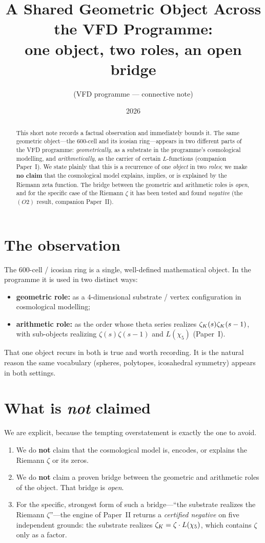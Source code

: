 \documentclass[11pt]{article}
\title{A Shared Geometric Object Across the VFD Programme:\\ one object, two roles,
an open bridge}
\author{(VFD programme --- connective note)}
\date{2026}
\begin{document}
\maketitle

\begin{abstract}
This short note records a factual observation and immediately bounds it. The same
geometric object---the $600$-cell and its icosian ring---appears in two different
parts of the VFD programme: \emph{geometrically}, as a substrate in the programme's
cosmological modelling, and \emph{arithmetically}, as the carrier of certain
$L$-functions (companion Paper~I). We state plainly that this is a recurrence of one
\emph{object} in two \emph{roles}; we make \textbf{no claim} that the cosmological
model explains, implies, or is explained by the Riemann zeta function. The bridge
between the geometric and arithmetic roles is \emph{open}, and for the specific case
of the Riemann $\zeta$ it has been tested and found \emph{negative} (the $(O2)$
result, companion Paper~II).
\end{abstract}

\section{The observation}
The $600$-cell / icosian ring is a single, well-defined mathematical object. In the
programme it is used in two distinct ways:
\begin{itemize}
  \item \textbf{geometric role:} as a $4$-dimensional substrate / vertex
  configuration in cosmological modelling;
  \item \textbf{arithmetic role:} as the order whose theta series realizes
  $\zeta_{K}(s)\zeta_{K}(s-1)$, with sub-objects realizing $\zeta(s)\zeta(s-1)$ and
  $L(\chi_5)$ (Paper~I).
\end{itemize}
That one object recurs in both is true and worth recording. It is the natural reason
the same vocabulary (spheres, polytopes, icosahedral symmetry) appears in both
settings.

\section{What is \emph{not} claimed}
We are explicit, because the tempting overstatement is exactly the one to avoid.
\begin{enumerate}
  \item We do \textbf{not} claim that the cosmological model is, encodes, or
  explains the Riemann $\zeta$ or its zeros.
  \item We do \textbf{not} claim a proven bridge between the geometric and arithmetic
  roles of the object. That bridge is \emph{open}.
  \item For the specific, strongest form of such a bridge---``the substrate realizes
  the Riemann $\zeta$''---the engine of Paper~II returns a \emph{certified negative}
  on five independent grounds: the substrate realizes $\zeta_{K}=\zeta\cdot L(\chi_5)$,
  which contains $\zeta$ only as a factor.
\end{enumerate}
\end{document}
